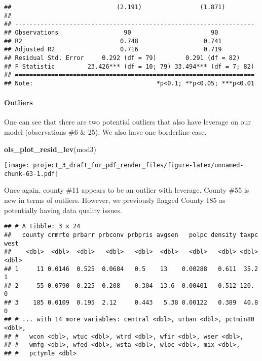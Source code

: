 \documentclass[]{article}
\newenvironment{Shaded}{\begin{snugshade}}{\end{snugshade}}
\newcommand{\DecValTok}[1]{\textcolor[rgb]{0.00,0.00,0.81}{#1}}
\newcommand{\KeywordTok}[1]{\textcolor[rgb]{0.13,0.29,0.53}{\textbf{#1}}}
\newcommand{\NormalTok}[1]{#1}
\newcommand{\OperatorTok}[1]{\textcolor[rgb]{0.81,0.36,0.00}{\textbf{#1}}}
\newcommand{\StringTok}[1]{\textcolor[rgb]{0.31,0.60,0.02}{#1}}
\let\oldparagraph\paragraph
\renewcommand{\paragraph}[1]{\oldparagraph{#1}\mbox{}}
\begin{document}
\begin{verbatim}
##                             (2.191)                (1.871)        
##                                                                   
## ------------------------------------------------------------------
## Observations                  90                      90          
## R2                           0.748                  0.741         
## Adjusted R2                  0.716                  0.719         
## Residual Std. Error     0.292 (df = 79)        0.291 (df = 82)    
## F Statistic         23.426*** (df = 10; 79) 33.494*** (df = 7; 82)
## ==================================================================
## Note:                                  *p<0.1; **p<0.05; ***p<0.01
\end{verbatim}

\hypertarget{outliers-2}{%
\paragraph{Outliers}\label{outliers-2}}

One can see that there are two potential outliers that also have
leverage on our model (observations \#6 \& 25). We also have one
borderline case.

\begin{Shaded}
\begin{Highlighting}[]
\KeywordTok{ols_plot_resid_lev}\NormalTok{(mod3)}
\end{Highlighting}
\end{Shaded}

\texttt{[image: project\_3\_draft\_for\_pdf\_render\_files/figure-latex/unnamed-chunk-63-1.pdf]}

Once again, county \#11 appears to be an outlier with leverage. County
\#55 is new in terms of outliers. However, we previously flagged County
185 as potentially having data quality issues.

\begin{Shaded}
\end{Shaded}

\begin{verbatim}
## # A tibble: 3 x 24
##   county crmrte prbarr prbconv prbpris avgsen   polpc density taxpc  west
##    <dbl>  <dbl>  <dbl>   <dbl>   <dbl>  <dbl>   <dbl>   <dbl> <dbl> <dbl>
## 1     11 0.0146  0.525  0.0684   0.5    13    0.00288   0.611  35.2     1
## 2     55 0.0790  0.225  0.208    0.304  13.6  0.00401   0.512 120.      0
## 3    185 0.0109  0.195  2.12     0.443   5.38 0.00122   0.389  40.8     0
## # ... with 14 more variables: central <dbl>, urban <dbl>, pctmin80 <dbl>,
## #   wcon <dbl>, wtuc <dbl>, wtrd <dbl>, wfir <dbl>, wser <dbl>,
## #   wmfg <dbl>, wfed <dbl>, wsta <dbl>, wloc <dbl>, mix <dbl>,
## #   pctymle <dbl>
\end{verbatim}
\end{document}
